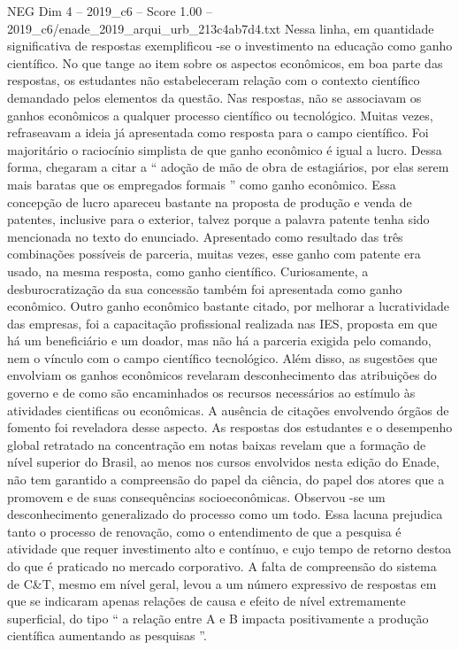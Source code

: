 \begin{textsample}{NEG Dim 4 – 2019\_c6 – Score 1.00 – 2019\_c6/enade\_2019\_arqui\_urb\_213c4ab7d4.txt}
Nessa linha, em quantidade significativa de respostas exemplificou -se o investimento na educação como ganho científico.
No que tange ao item sobre os aspectos econômicos, em boa parte das respostas, os estudantes não estabeleceram relação com o contexto científico demandado pelos elementos da questão.
Nas respostas, não se associavam os ganhos econômicos a qualquer processo científico ou tecnológico.
Muitas vezes, refraseavam a ideia já apresentada como resposta para o campo científico.
Foi majoritário o raciocínio simplista de que ganho econômico é igual a lucro.
Dessa forma, chegaram a citar a “ adoção de mão de obra de estagiários, por elas serem mais baratas que os empregados formais ” como ganho econômico.
Essa concepção de lucro apareceu bastante na proposta de produção e venda de patentes, inclusive para o exterior, talvez porque a palavra patente tenha sido mencionada no texto do enunciado.
Apresentado como resultado das três combinações possíveis de parceria, muitas vezes, esse ganho com patente era usado, na mesma resposta, como ganho científico.
Curiosamente, a desburocratização da sua concessão também foi apresentada como ganho econômico.
Outro ganho econômico bastante citado, por melhorar a lucratividade das empresas, foi a capacitação profissional realizada nas IES, proposta em que há um beneficiário e um doador, mas não há a parceria exigida pelo comando, nem o vínculo com o campo científico tecnológico.
Além disso, as sugestões que envolviam os ganhos econômicos revelaram desconhecimento das atribuições do governo e de como são encaminhados os recursos necessários ao estímulo às atividades cientificas ou econômicas.
A ausência de citações envolvendo órgãos de fomento foi reveladora desse aspecto.
As respostas dos estudantes e o desempenho global retratado na concentração em notas baixas revelam que a formação de nível superior do Brasil, ao menos nos cursos envolvidos nesta edição do Enade, não tem garantido a compreensão do papel da ciência, do papel dos atores que a promovem e de suas consequências socioeconômicas.
Observou -se um desconhecimento generalizado do processo como um todo.
Essa lacuna prejudica tanto o processo de renovação, como o entendimento de que a pesquisa é atividade que requer investimento alto e contínuo, e cujo tempo de retorno destoa do que é praticado no mercado corporativo.
A falta de compreensão do sistema de C\&T, mesmo em nível geral, levou a um número expressivo de respostas em que se indicaram apenas relações de causa e efeito de nível extremamente superficial, do tipo “ a relação entre A e B impacta positivamente a produção científica aumentando as pesquisas ”.

\end{textsample}
